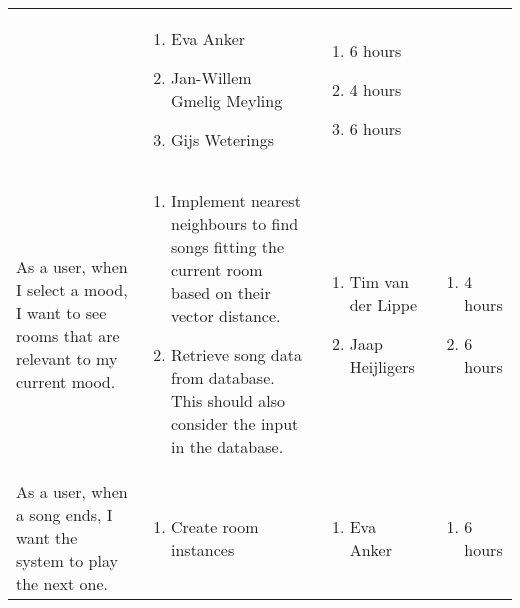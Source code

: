 \documentclass[11pt,a4paper]{article}
\begin{document}
\begin{table}[h]
\begin{tabular}{|p{4.5cm}|p{7cm}|p{4cm}|p{2.6cm}|}
& 
\begin{enumerate}
\item Eva Anker
\item Jan-Willem Gmelig Meyling
\item Gijs Weterings
\end{enumerate}

& 
\begin{enumerate}
\item 6 hours
\item 4 hours
\item 6 hours
\end{enumerate}
\\

As a user, when I select a mood, I want to see rooms that are relevant to my current mood.

&
\begin{enumerate}
\item Implement nearest neighbours to find songs fitting the current room based on their vector distance.
\item Retrieve song data from database. This should also consider the input in the database.
\end{enumerate}

& 
\begin{enumerate}
\item Tim van der Lippe
\item Jaap Heijligers
\end{enumerate}

& 
\begin{enumerate}
\item 4 hours
\item 6 hours
\end{enumerate}
\\

As a user, when a song ends, I want the system to play the next one.
&
\begin{enumerate}
\item Create room instances 
\end{enumerate}

& 
\begin{enumerate}
\item Eva Anker
\end{enumerate}

& 
\begin{enumerate}
\item 6 hours
\end{enumerate}
\\



\end{tabular}
\end{table}
\end{document}
